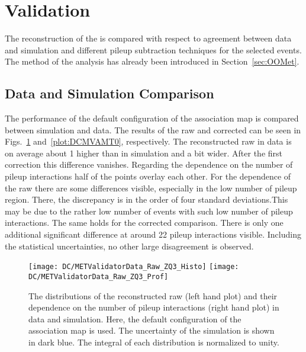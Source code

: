 \section{\texorpdfstring{\MET{}}{MET} Validation \label{sec:DCMV}}

The reconstruction of the \MET{} is compared with respect to agreement between data and simulation and different pileup subtraction techniques for the selected events. The method of the analysis has already been introduced in Section~\ref{sec:OOMet}. 

\subsection{Data and Simulation Comparison \label{sec:DCMVDSC}}
 
The performance of the default configuration of the association map is compared between simulation and data. The results of the raw and corrected \MET{} can be seen in Figs.~\ref{plot:DCMVAMRaw} and~\ref{plot:DCMVAMT0}, respectively. The reconstructed raw \MET{} in data is on average about 1\GeV{} higher than in simulation and a bit wider. After the first correction this difference vanishes. Regarding the dependence on the number of pileup interactions half of the points overlay each other. For the dependence of the raw \MET{} there are some differences visible, especially in the low number of pileup region. There, the discrepancy is in the order of four standard deviations.This may be due to the rather low number of events with such  low number of pileup interactions. The same holds for the corrected \MET{} comparison. There is only one additional significant difference at around 22 pileup interactions visible. Including the statistical uncertainties, no other large disagreement is observed.

\begin{figure}[Ht]
  \centering
  \texttt{[image: DC/METValidatorData\_Raw\_ZQ3\_Histo]}
  \texttt{[image: DC/METValidatorData\_Raw\_ZQ3\_Prof]}
  \caption[Raw missing transverse energy distribution of different options of the association map in data and simulation]{The distributions of the reconstructed raw \MET{} (left hand plot) and their dependence on the number of pileup interactions (right hand plot) in data and simulation. Here, the default configuration of the association map is used. The uncertainty of the simulation is shown in dark blue. The integral of each distribution is normalized to unity. \label{plot:DCMVAMRaw}}
\end{figure}

